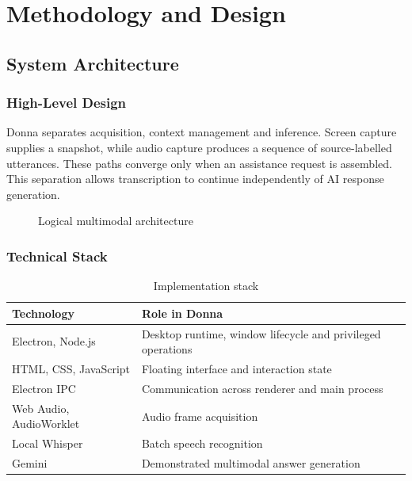 \documentclass[openany]{tietreport}
\begin{document}
\chapter{Methodology and Design}
\section{System Architecture}
\subsection{High-Level Design}
Donna separates acquisition, context management and inference. Screen capture supplies a snapshot, while audio capture produces a sequence of source-labelled utterances. These paths converge only when an assistance request is assembled. This separation allows transcription to continue independently of AI response generation.
\begin{figure}[htbp]\centering
{}\caption{Logical multimodal architecture}\end{figure}
\subsection{Technical Stack}
\begin{table}[htbp]\centering\small\begin{tabularx}{\linewidth}{@{}lX@{}}\toprule
Technology & Role in Donna \\ \midrule
Electron, Node.js & Desktop runtime, window lifecycle and privileged operations \\
HTML, CSS, JavaScript & Floating interface and interaction state \\
Electron IPC & Communication across renderer and main process \\
Web Audio, AudioWorklet & Audio frame acquisition \\
Local Whisper & Batch speech recognition \\
Gemini & Demonstrated multimodal answer generation \\
\bottomrule\end{tabularx}\caption{Implementation stack}\end{table}
\end{document}
